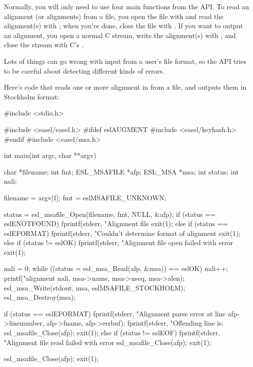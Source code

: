 Normally, you will only need to use four main functions from the API.
To read an alignment (or alignments) from a file, you open the file
with  and read the alignment(s) with
; when you're done, close the file with
. If you want to output an alignment, you
open a normal C  stream, write the alignment(s) with
, and close the stream with C's
.

Lots of things can go wrong with input from a user's file format, so
the API tries to be careful about detecting different kinds of errors.

Here's code that reads one or more alignment in from a file, and
outputs them in Stockholm format:

\begin{cchunk}
#include <stdio.h>

#include <easel/easel.h>
#ifdef eslAUGMENT
#include <easel/keyhash.h>
#endif
#include <easel/msa.h>

int
main(int argc, char **argv)
{
  char        *filename;
  int          fmt;
  ESL_MSAFILE *afp;
  ESL_MSA     *msa;
  int          status;
  int          nali;

  filename = argv[1];
  fmt      = eslMSAFILE_UNKNOWN;

  status = esl_msafile_Open(filename, fmt, NULL, &afp);
  if (status == eslENOTFOUND) 
    {
      fprintf(stderr, "Alignment file %
      exit(1);
    } 
  else if (status == eslEFORMAT) 
    {
      fprintf(stderr, "Couldn't determine format of alignment %
      exit(1);
    } 
  else if (status != eslOK) 
    {
      fprintf(stderr, "Alignment file open failed with error %
      exit(1);
    }

  nali = 0;
  while ((status = esl_msa_Read(afp, &msa)) == eslOK)
    {
      nali++;
      printf("alignment %
	     nali, msa->name, msa->nseq, msa->alen);
      esl_msa_Write(stdout, msa, eslMSAFILE_STOCKHOLM);
      esl_msa_Destroy(msa);
    }

  if (status == eslEFORMAT) 
    {
      fprintf(stderr, "Alignment parse error at line %
	      afp->linenumber, afp->fname, afp->errbuf);
      fprintf(stderr, "Offending line is: %
      esl_msafile_Close(afp);
      exit(1);
    } 
  else if (status != eslEOF) 
    {
      fprintf(stderr, "Alignment file read failed with error %
      esl_msafile_Close(afp);
      exit(1);
    }

  esl_msafile_Close(afp);
  exit(1);
}
\end{cchunk}

